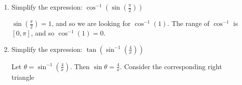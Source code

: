 \documentclass[nooutcomes]{ximera}
\begin{document}
			
			
\begin{problem}
	
			\begin{enumerate}
			
			\item  Simplify the expression:  $\cos^{-1} \left( \sin \left( \frac{\pi }{2} \right) \right) $ 
			
			 \begin{freeResponse}			 
			 $ \sin \left( \frac{\pi}{2} \right) = 1$, and so we are looking for $\cos^{-1}(1)$.  The range of $\cos^{-1}$ is $[0, \pi]$, and so $\cos^{-1} (1) = 0$.  
			 \end{freeResponse}
			 
			 
			 
			 
			 
			 
			
			\item  Simplify the expression:  $ \tan \left( \sin^{-1} \left( \frac{4}{x} \right) \right) $ 
			
			 \begin{freeResponse}			 
			 Let $\theta = \sin^{-1} \left( \frac{4}{x} \right) $.  Then $\sin \theta = \frac{4}{x}$.  Consider the corresponding right triangle
			 

\end{freeResponse}
\end{enumerate}
\end{problem}
\end{document}

